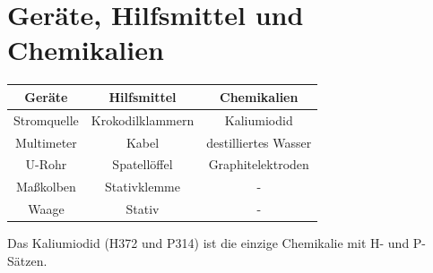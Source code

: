\documentclass[11pt]{article}
\begin{document}
\section{Geräte, Hilfsmittel und Chemikalien}
\begin{center}

    \begin{tabular}{ c|c|c } 
        Geräte & Hilfsmittel & Chemikalien \\ 
        \hline
        Stromquelle & Krokodilklammern & Kaliumiodid \\ 
        Multimeter & Kabel & destilliertes Wasser \\
        U-Rohr & Spatellöffel & Graphitelektroden \\
        Maßkolben & Stativklemme & - \\
        Waage & Stativ & - \\ 
       \end{tabular}

\end{center}
\noindent
Das Kaliumiodid (H372 und P314) ist die einzige Chemikalie mit H- und P-Sätzen.
\end{document}
